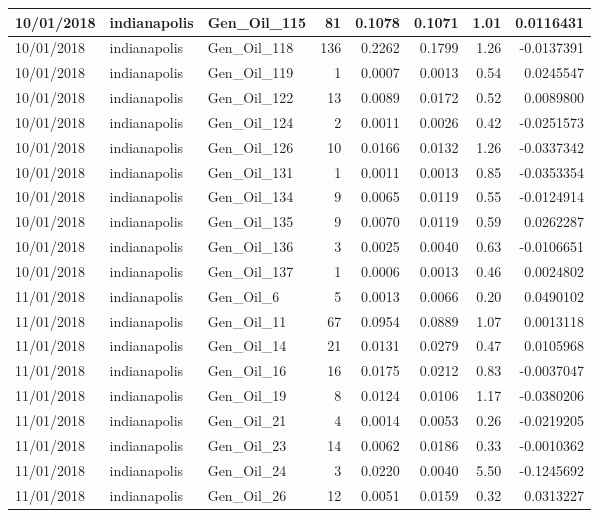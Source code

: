 \documentclass[
  letterpaper,
  DIV=11,
  numbers=noendperiod]{scrartcl}
\begin{document}
\begin{tabular}{l|l|l|r|r|r|r|r}
\hline
10/01/2018 & indianapolis & Gen\_Oil\_115 & 81 & 0.1078 & 0.1071 & 1.01 & 0.0116431\\
\hline
10/01/2018 & indianapolis & Gen\_Oil\_118 & 136 & 0.2262 & 0.1799 & 1.26 & -0.0137391\\
\hline
10/01/2018 & indianapolis & Gen\_Oil\_119 & 1 & 0.0007 & 0.0013 & 0.54 & 0.0245547\\
\hline
10/01/2018 & indianapolis & Gen\_Oil\_122 & 13 & 0.0089 & 0.0172 & 0.52 & 0.0089800\\
\hline
10/01/2018 & indianapolis & Gen\_Oil\_124 & 2 & 0.0011 & 0.0026 & 0.42 & -0.0251573\\
\hline
10/01/2018 & indianapolis & Gen\_Oil\_126 & 10 & 0.0166 & 0.0132 & 1.26 & -0.0337342\\
\hline
10/01/2018 & indianapolis & Gen\_Oil\_131 & 1 & 0.0011 & 0.0013 & 0.85 & -0.0353354\\
\hline
10/01/2018 & indianapolis & Gen\_Oil\_134 & 9 & 0.0065 & 0.0119 & 0.55 & -0.0124914\\
\hline
10/01/2018 & indianapolis & Gen\_Oil\_135 & 9 & 0.0070 & 0.0119 & 0.59 & 0.0262287\\
\hline
10/01/2018 & indianapolis & Gen\_Oil\_136 & 3 & 0.0025 & 0.0040 & 0.63 & -0.0106651\\
\hline
10/01/2018 & indianapolis & Gen\_Oil\_137 & 1 & 0.0006 & 0.0013 & 0.46 & 0.0024802\\
\hline
11/01/2018 & indianapolis & Gen\_Oil\_6 & 5 & 0.0013 & 0.0066 & 0.20 & 0.0490102\\
\hline
11/01/2018 & indianapolis & Gen\_Oil\_11 & 67 & 0.0954 & 0.0889 & 1.07 & 0.0013118\\
\hline
11/01/2018 & indianapolis & Gen\_Oil\_14 & 21 & 0.0131 & 0.0279 & 0.47 & 0.0105968\\
\hline
11/01/2018 & indianapolis & Gen\_Oil\_16 & 16 & 0.0175 & 0.0212 & 0.83 & -0.0037047\\
\hline
11/01/2018 & indianapolis & Gen\_Oil\_19 & 8 & 0.0124 & 0.0106 & 1.17 & -0.0380206\\
\hline
11/01/2018 & indianapolis & Gen\_Oil\_21 & 4 & 0.0014 & 0.0053 & 0.26 & -0.0219205\\
\hline
11/01/2018 & indianapolis & Gen\_Oil\_23 & 14 & 0.0062 & 0.0186 & 0.33 & -0.0010362\\
\hline
11/01/2018 & indianapolis & Gen\_Oil\_24 & 3 & 0.0220 & 0.0040 & 5.50 & -0.1245692\\
\hline
11/01/2018 & indianapolis & Gen\_Oil\_26 & 12 & 0.0051 & 0.0159 & 0.32 & 0.0313227\\

\end{tabular}
\end{document}
